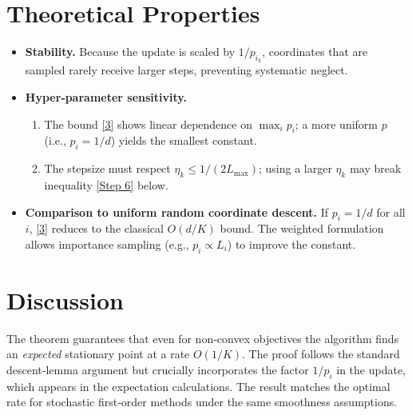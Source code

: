 \documentclass{article}
\begin{document}
\section*{Theoretical Properties}
\begin{itemize}
\item \textbf{Stability.} Because the update is scaled by $1/p_{i_{k}}$, coordinates that are sampled rarely receive larger steps, preventing systematic neglect.
\item \textbf{Hyper‑parameter sensitivity.}
    \begin{enumerate}
    \item The bound \eqref{3} shows linear dependence on $\max_{i}p_{i}$; a more uniform $p$ (i.e., $p_{i}=1/d$) yields the smallest constant.
    \item The stepsize must respect $\eta_{k}\le 1/(2L_{\max})$; using a larger $\eta_{k}$ may break inequality \eqref{Step 6} below.
    \end{enumerate}
\item \textbf{Comparison to uniform random coordinate descent.}
    If $p_{i}=1/d$ for all $i$, \eqref{3} reduces to the classical $O(d/K)$ bound.
    The weighted formulation allows importance sampling (e.g., $p_{i}\propto L_{i}$) to improve the constant.
\end{itemize}

\section*{Discussion}
The theorem guarantees that even for non‑convex objectives the algorithm finds an
\emph{expected} stationary point at a rate $O(1/K)$.  The proof follows the
standard descent‑lemma argument but crucially incorporates the factor $1/p_{i}$
in the update, which appears in the expectation calculations.  The result
matches the optimal rate for stochastic first‑order methods under the same
smoothness assumptions.

\newpage
\end{document}
